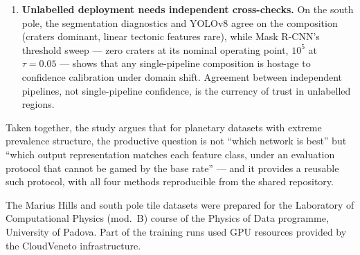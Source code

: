 \documentclass{aa}
\begin{document}
\begin{enumerate}
    \item \textbf{Unlabelled deployment needs independent cross-checks.} On the south pole, the segmentation diagnostics and YOLOv8 agree on the composition (craters dominant, linear tectonic features rare), while Mask R-CNN's threshold sweep --- zero craters at its nominal operating point, $10^5$ at $\tau=0.05$ --- shows that any single-pipeline composition is hostage to confidence calibration under domain shift. Agreement between independent pipelines, not single-pipeline confidence, is the currency of trust in unlabelled regions.
\end{enumerate}

Taken together, the study argues that for planetary datasets with extreme prevalence structure, the productive question is not ``which network is best'' but ``which output representation matches each feature class, under an evaluation protocol that cannot be gamed by the base rate'' --- and it provides a reusable such protocol, with all four methods reproducible from the shared repository.

\begin{acknowledgements}
      The Marius Hills and south pole tile datasets were prepared for the Laboratory of Computational Physics (mod.~B) course of the Physics of Data programme, University of Padova. Part of the training runs used GPU resources provided by the CloudVeneto infrastructure.
\end{acknowledgements}


\FloatBarrier
\end{document}
